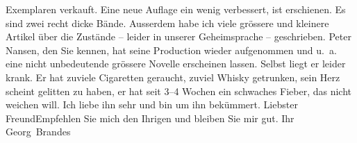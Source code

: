 \begin{ledgroupsized}[t]{13cm}
                    Exemplaren verkauft. Eine neue Auflage ein wenig verbessert, ist erschienen. Es
                    sind zwei recht dicke Bände. Ausserdem habe ich viele grössere und kleinere
                    Artikel über die Zustände – leider in unserer Geheimsprache – geschrieben.\pend
           \pstart
           Peter Nansen, den Sie kennen, hat seine
                    Production wieder aufgenommen und u. a. eine nicht unbedeutende grössere Novelle erscheinen lassen.
                    Selbst liegt er leider krank. Er hat zuviele {\pb}Cigaretten geraucht, zuviel
                    Whisky getrunken, sein Herz scheint gelitten zu haben, er hat seit 3–4 Wochen
                        ein
               schwaches Fieber, das nicht weichen
                    will. Ich liebe ihn sehr und bin um ihn bekümmert.\pend
           \pstart
           Liebster Freund\hspace*{1.5em}Empfehlen Sie mich den Ihrigen
                    und bleiben Sie mir gut.\pend
           \pstart Ihr \spacefill\mbox{Georg Brandes}\pend{}
         
         \endnumbering{}\end{ledgroupsized}  \newcommand{\dateiname}{L02221}\newcommand{\titel}{Georg Brandes an Arthur Schnitzler, 4. 12. 1915}\newcommand{\editorInnen}{Martin Anton Müller und Gerd-Hermann Susen}
      